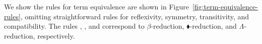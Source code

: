 
We show the rules for term equivalence are shown in
Figure~\ref{fig:term-equivalence-rules}, omitting
straightforward rules for reflexivity, symmetry, transitivity,
and compatibility.
The rules \QBeta, \QTBLTB, and \QLambda{} correspond to
$\beta$-reduction, $\blacklozenge$-reduction, and $\Lambda$-reduction, respectively.

